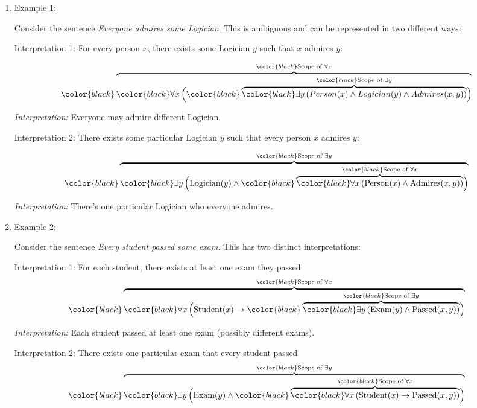 \begin{enumerate}
\def\labelenumi{\arabic{enumi}.}
\item
  Example 1:

  Consider the sentence \emph{Everyone admires some Logician}. This is
  ambiguous and can be represented in two different ways:

  Interpretation 1: For every person \(x\), there exists some Logician
  \(y\) such that \(x\) admires \(y\):

  \[
   {\color{black}\overbrace{\color{black}\forall x \, \Big(
   {\color{black}\overbrace{\color{black}\exists y \, (Person(x) \wedge Logician(y) \wedge Admires(x,y))}^{\color{black}\text{Scope of } \exists y}}
   \Big)}^{\color{black}\text{Scope of } \forall x}}
   \]

  \emph{Interpretation:} Everyone may admire different Logician.

  Interpretation 2: There exists some particular Logician \(y\) such
  that every person \(x\) admires \(y\):

  \[
   {\color{black}\overbrace{\color{black}\exists y \,
   \Big(
   \text{Logician}(y) \wedge
   {\color{black}\overbrace{\color{black}\forall x \,
   ( \text{Person}(x) \wedge \text{Admires}(x,y) )
   }^{\color{black}\text{Scope of } \forall x}}
   \Big)
   }^{\color{black}\text{Scope of } \exists y}}
   \]

  \emph{Interpretation:} There's one particular Logician who everyone
  admires.
\item
  Example 2:

  Consider the sentence \emph{Every student passed some exam}. This has
  two distinct interpretations:

  Interpretation 1: For each student, there exists at least one exam
  they passed \[
   {\color{black}\overbrace{\color{black}\forall x \, \Big(
   \text{Student}(x) \rightarrow
   {\color{black}\overbrace{\color{black}\exists y \, (\text{Exam}(y) \wedge \text{Passed}(x,y))}^{\color{black}\text{Scope of } \exists y}}
   \Big)}^{\color{black}\text{Scope of } \forall x}}
   \]

  \emph{Interpretation:} Each student passed at least one exam (possibly
  different exams).

  Interpretation 2: There exists one particular exam that every student
  passed \[
   {\color{black}\overbrace{\color{black}\exists y \,
   \Big(
   \text{Exam}(y) \wedge
   {\color{black}\overbrace{\color{black}\forall x \, 
   ( \text{Student}(x) \rightarrow \text{Passed}(x,y) )
   }^{\color{black}\text{Scope of } \forall x}}
   \Big)
   }^{\color{black}\text{Scope of } \exists y}}
   \]


\end{enumerate}
